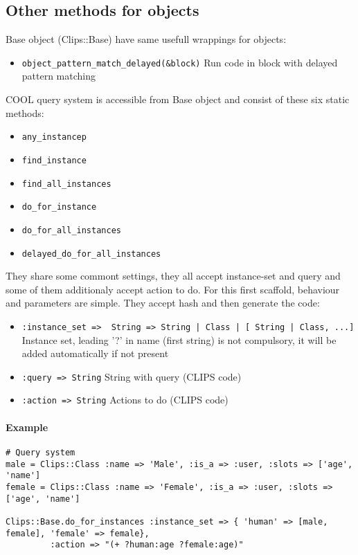 \documentclass[a4paper,10pt]{article}
\begin{document}
\subsection{Other methods for objects}
Base object (Clips::Base) have same usefull wrappings for objects:
\begin{itemize}
 \item \texttt{object\_pattern\_match\_delayed(\&block)} Run code in block with delayed pattern matching
\end{itemize}

COOL query system is accessible from Base object and consist of these six static methods:
\begin{itemize}
 \item \texttt{any\_instancep}
 \item \texttt{find\_instance}
 \item \texttt{find\_all\_instances}
 \item \texttt{do\_for\_instance} 
 \item \texttt{do\_for\_all\_instances}
 \item \texttt{delayed\_do\_for\_all\_instances}
\end{itemize}

They share some commont settings, they all accept instance-set and query and some of them additionaly accept action to do. For this first scaffold, behaviour and parameters are simple. They accept hash and then generate the code:
\begin{itemize}
 \item \texttt{:instance\_set => { String => String | Class | [ String | Class, ...]}} Instance set, leading '?' in name (first string) is not compulsory, it will be added automatically if not present
 \item \texttt{:query => String} String with query (CLIPS code)
 \item \texttt{:action => String} Actions to do (CLIPS code)
\end{itemize}

\paragraph{Example}
\begin{verbatim}
# Query system
male = Clips::Class :name => 'Male', :is_a => :user, :slots => ['age', 'name']
female = Clips::Class :name => 'Female', :is_a => :user, :slots => ['age', 'name']

Clips::Base.do_for_instances :instance_set => { 'human' => [male, female], 'female' => female},
         :action => "(+ ?human:age ?female:age)"
\end{verbatim}
\end{document}
